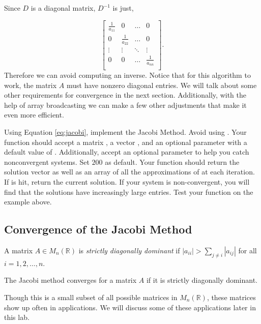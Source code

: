 Since $D$ is a diagonal matrix, $D^{-1}$ is just,

$$
\begin{bmatrix}
\frac{1}{a_{11}} & 0 & \ldots & 0 \\
0 & \frac{1}{a_{22}} & \ldots & 0 \\
 \vdots & \vdots & \ddots & \vdots \\
0 & 0 & \ldots & \frac{1}{a_{nn}} \\
\end{bmatrix}.
$$
Therefore we can avoid computing an inverse. Notice that for this algorithm to work, the matrix $A$ must have nonzero diagonal entries. We will talk about some other requirements for convergence in the next section. Additionally, with the help of array broadcasting we can make a few other adjustments that make it even more efficient.

\begin{problem} \label{prob:jacobi}
Using Equation \ref{eq:jacobi}, implement the Jacobi Method. Avoid using . Your function should accept a matrix , a vector , and an optional parameter  with a default value of . Additionally, accept an optional parameter  to help you catch nonconvergent systems. Set  $200$ as default. Your function should return the solution vector  as well as an array of all the approximations of  at each iteration. If  is hit, return the current solution. If your system is non-convergent, you will find that the solutions have increasingly large entries. Test your function on the example above.

\end{problem}

\subsection*{Convergence of the Jacobi Method}
\begin{definition}
    A matrix $A \in M_n(\mathbb{R})$ is \emph{strictly diagonally dominant} if $|a_{ii}| > \sum_{j \neq i} |a_{ij}|$ for all $i = 1,2,\hdots,n$.
\end{definition}

\begin{theorem}
The Jacobi method converges for a matrix $A$ if it is strictly diagonally dominant.
\end{theorem}

Though this is a small subset of all possible matrices in $M_n(\mathbb{R})$, these matrices show up often in applications. We will discuss some of these applications later in this lab.

